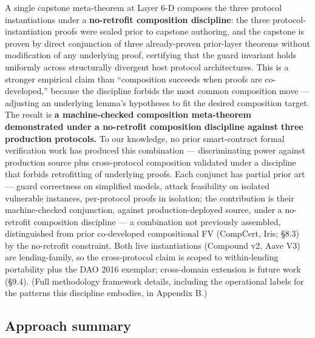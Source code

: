 A single capstone meta-theorem at Layer 6-D composes the three protocol
instantiations under a \textbf{no-retrofit composition discipline}: the
three protocol-instantiation proofs were sealed prior to capstone
authoring, and the capstone is proven by direct conjunction of three
already-proven prior-layer theorems without modification of any
underlying proof, certifying that the guard invariant holds uniformly
across structurally divergent host protocol architectures. This is a
stronger empirical claim than ``composition succeeds when proofs are
co-developed,'' because the discipline forbids the most common
composition move --- adjusting an underlying lemma's hypotheses to fit
the desired composition target. The result is \textbf{a machine-checked
composition meta-theorem demonstrated under a no-retrofit composition
discipline against three production protocols.} To our knowledge, no
prior smart-contract formal verification work has produced this
combination --- discriminating power against production source plus
cross-protocol composition validated under a discipline that forbids
retrofitting of underlying proofs. Each conjunct has partial prior art
--- guard correctness on simplified models, attack feasibility on
isolated vulnerable instances, per-protocol proofs in isolation; the
contribution is their machine-checked conjunction, against
production-deployed source, under a no-retrofit composition discipline
--- a combination not previously assembled, distinguished from prior
co-developed compositional FV (CompCert, Iris; §8.3) by the no-retrofit
constraint. Both live instantiations (Compound v2, Aave V3) are
lending-family, so the cross-protocol claim is scoped to within-lending
portability plus the DAO 2016 exemplar; cross-domain extension is future
work (§9.4). (Full methodology framework details, including the
operational labels for the patterns this discipline embodies, in
Appendix B.)

\subsection{Approach summary}\label{approach-summary}

